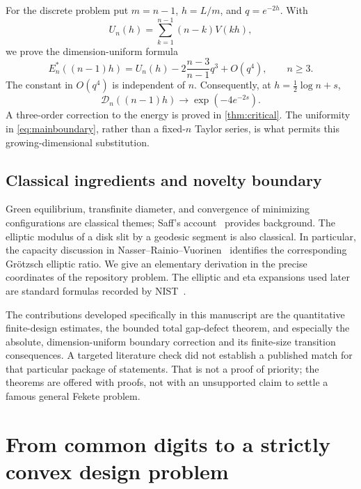 \documentclass[11pt,a4paper]{article}
\theoremstyle{definition}
\theoremstyle{remark}
\newcommand{\Dopt}{\mathcal D}
\begin{document}
For the discrete problem put $m=n-1$, $h=L/m$, and $q=e^{-2h}$. With
\begin{equation}
 U_n(h)=\sum_{k=1}^{n-1}(n-k)V(kh),
 \label{eq:gridenergy}
\end{equation}
we prove the dimension-uniform formula
\begin{equation}
 \boxed{\displaystyle
 E_n^*((n-1)h)=U_n(h)-2\frac{n-3}{n-1}q^3+O(q^4),\qquad n\ge3.}
 \label{eq:mainboundary}
\end{equation}
The constant in $O(q^4)$ is independent of $n$. Consequently, at
$h=\tfrac12\log n+s$,
\begin{equation}
 \boxed{\displaystyle
 \Dopt_n((n-1)h)\longrightarrow \exp(-4e^{-2s}).}
 \label{eq:maintransition}
\end{equation}
A three-order correction to the energy is proved in \cref{thm:critical}.
The uniformity in \eqref{eq:mainboundary}, rather than a fixed-$n$ Taylor
series, is what permits this growing-dimensional substitution.

\subsection{Classical ingredients and novelty boundary}
Green equilibrium, transfinite diameter, and convergence of minimizing
configurations are classical themes; Saff's account~\cite{saff} provides
background. The elliptic modulus of a disk slit by a geodesic segment is
also classical. In particular, the capacity discussion in
Nasser--Rainio--Vuorinen~\cite{nrv} identifies the corresponding
Gr\"otzsch elliptic ratio. We give an elementary derivation in the precise
coordinates of the repository problem. The elliptic and eta expansions
used later are standard formulas recorded by NIST~\cite{dlmf19,dlmf23}.

The contributions developed specifically in this manuscript are the
quantitative finite-design estimates, the bounded total gap-defect theorem,
and especially the absolute, dimension-uniform boundary correction and its
finite-size transition consequences. A targeted literature check did not
establish a published match for that particular package of statements.
That is not a proof of priority; the theorems are offered with proofs, not
with an unsupported claim to settle a famous general Fekete problem.

\section{From common digits to a strictly convex design problem}
\label{sec:covariance}
\end{document}

